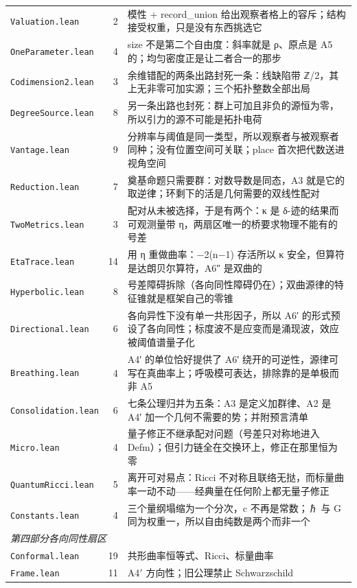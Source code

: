 \documentclass[11pt,a4paper]{article}
\theoremstyle{sudef}
\begin{document}
\begin{center}
\begin{longtable}{lrl}
\texttt{Valuation.lean} & 2 & 模性 + record_union 给出观察者格上的容斥；结构接受权重，只是没有东西挑选它 \\
\texttt{OneParameter.lean} & 4 & size 不是第二个自由度：斜率就是 ρ、原点是 A5 的；均匀密度正是让二者合一的那步 \\
\texttt{Codimension2.lean} & 3 & 余维错配的两条出路封死一条：线缺陷带 ℤ/2，其上无非零可加实源；三个拓扑整数全部出局 \\
\texttt{DegreeSource.lean} & 8 & 另一条出路也封死：群上可加且非负的源恒为零，所以引力的源不可能是拓扑电荷 \\
\texttt{Vantage.lean} & 9 & 分辨率与阈值是同一类型，所以观察者与被观察者同种；没有位置空间可关联；place 首次把代数送进视角空间 \\
\texttt{Reduction.lean} & 7 & 奠基命题只需要群：对数导数是同态，A3 就是它的取逆律；环剩下的活是几何需要的双线性配对 \\
\texttt{TwoMetrics.lean} & 3 & 配对从未被选择，于是有两个：κ 是 δ-迹的结果而可观测量带 η，两扇区唯一的桥要求物理不能有的号差 \\
\texttt{EtaTrace.lean} & 14 & 用 η 重做曲率：−2(n−1) 存活所以 κ 安全，但算符是达朗贝尔算符，A6″ 是双曲的 \\
\texttt{Hyperbolic.lean} & 8 & 号差障碍拆除（各向同性障碍仍在）；双曲源律的特征锥就是框架自己的零锥 \\
\texttt{Directional.lean} & 6 & 各向异性下没有单一共形因子，所以 A6′ 的形式预设了各向同性；标度波不是应变而是涌现波，效应被阈值谱量子化 \\
\texttt{Breathing.lean} & 4 & A4′ 的单位恰好提供了 A6′ 绕开的可逆性，源律可写在真曲率上；呼吸模可表达，排除靠的是单极而非 A5 \\
\texttt{Consolidation.lean} & 6 & 七条公理归并为五条：A3 是定义加群律、A2 是 A4′ 加一个几何不需要的势；并附预言清单 \\
\texttt{Micro.lean} & 4 & 量子修正不继承配对问题（号差只对称地进入 Defm）；但引力链全在交换环上，修正在那里恒为零 \\
\texttt{QuantumRicci.lean} & 5 & 离开可对易点：Ricci 不对称且联络无挞，而标量曲率一动不动——经典量在任何阶上都无量子修正 \\
\texttt{Constants.lean} & 4 & 三个量纲塌缩为一个分次，c 不再是常数；ℏ 与 G 同为权重一，所以自由纯数是两个而非一个 \\
\midrule
\multicolumn{3}{l}{\emph{第四部分\quad 各向同性扇区}}\\
\texttt{Conformal.lean} & 19 & 共形曲率恒等式、Ricci、标量曲率 \\
\texttt{Frame.lean} & 11 & A4$'$ 方向性；旧公理禁止 Schwarzschild \\

\end{longtable}
\end{center}
\end{document}
